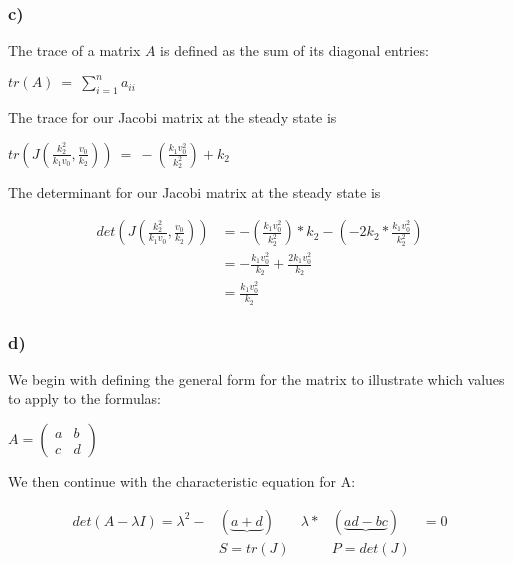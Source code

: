 \documentclass[]{scrartcl}
\begin{document}

\subsubsection*{c)}

\noindent The trace of a matrix $A$ is defined as the sum of its diagonal entries:

\begin{center}
$
tr(A) ~=~ \sum_{i=1}^n a_{ii}
$
\end{center}

\noindent The trace for our Jacobi matrix at the steady state is

\begin{center}
$
tr \left( J \left( \frac{k_2^2}{k_1 v_0} , \frac{v_0}{k_2} \right) \right) ~=~ -\left( \frac{k_1 v_0^2}{k_2^2} \right) + k_2
$
\end{center}

\noindent The determinant for our Jacobi matrix at the steady state is

\begin{center}
\begin{align*}
det \left( J \left( \frac{k_2^2}{k_1 v_0} , \frac{v_0}{k_2} \right) \right) &= -\left( \frac{k_1 v_0^2}{k_2^2} \right) * k_2 - \left( -2 k_2 * \frac{k_1 v_0^2}{k_2^2} \right) \\
&= - \frac{k_1 v_0^2}{k_2} + \frac{2 k_1 v_0^2}{k_2} \\
&= \frac{k_1 v_0^2}{k_2}
\end{align*}
\end{center}



\subsubsection*{d)}

\noindent We begin with defining the general form for the matrix to illustrate which values to apply to the formulas:

\begin{center}
$
	A = \begin{pmatrix}
		   a & b \\[1ex] %
		   c & d
		\end{pmatrix}
$
\end{center}

\noindent We then continue with the characteristic equation for A:
\begin{center}
\begin{align*}
	det(A - \lambda I) = \lambda^2 - & (\underbrace{a+d}) & \lambda * & (\underbrace{ad-bc}) & = 0 \\
								   	 & 			  S=tr(J) & 		  & 			P=det(J) &	   \\
\end{align*}
\end{center}
\end{document}

